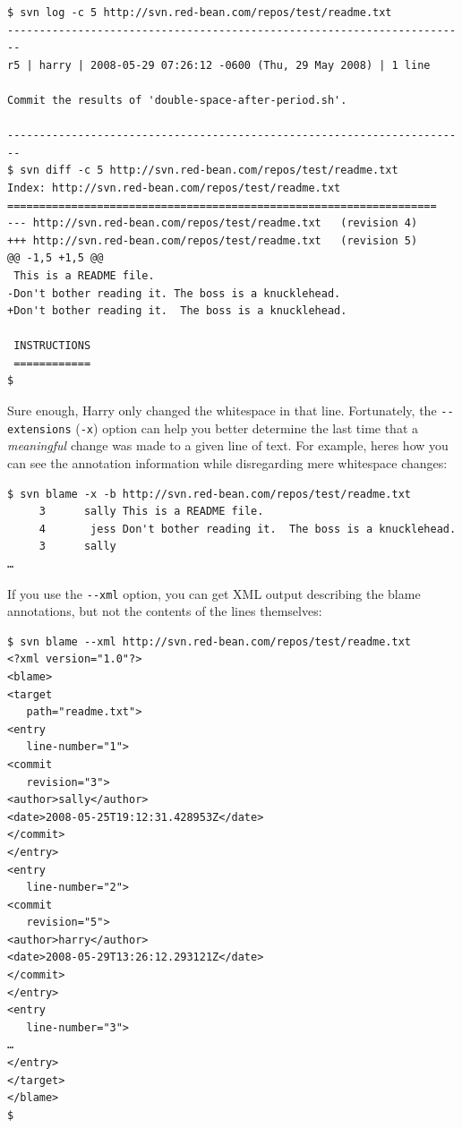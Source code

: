 \begin{verbatim}
$ svn log -c 5 http://svn.red-bean.com/repos/test/readme.txt
------------------------------------------------------------------------
r5 | harry | 2008-05-29 07:26:12 -0600 (Thu, 29 May 2008) | 1 line

Commit the results of 'double-space-after-period.sh'.

------------------------------------------------------------------------
$ svn diff -c 5 http://svn.red-bean.com/repos/test/readme.txt
Index: http://svn.red-bean.com/repos/test/readme.txt
===================================================================
--- http://svn.red-bean.com/repos/test/readme.txt   (revision 4)
+++ http://svn.red-bean.com/repos/test/readme.txt   (revision 5)
@@ -1,5 +1,5 @@
 This is a README file.
-Don't bother reading it. The boss is a knucklehead.
+Don't bother reading it.  The boss is a knucklehead.
  
 INSTRUCTIONS
 ============
$
\end{verbatim}

Sure enough, Harry only changed the whitespace in that line.
Fortunately, the \texttt{-\/-extensions} (\texttt{-x}) option can help
you better determine the last time that a \emph{meaningful} change was
made to a given line of text. For example, here\textquotesingle s how
you can see the annotation information while disregarding mere
whitespace changes:

\begin{verbatim}
$ svn blame -x -b http://svn.red-bean.com/repos/test/readme.txt
     3      sally This is a README file.
     4       jess Don't bother reading it.  The boss is a knucklehead.
     3      sally 
…
\end{verbatim}

If you use the \texttt{-\/-xml} option, you can get XML output
describing the blame annotations, but not the contents of the lines
themselves:

\begin{verbatim}
$ svn blame --xml http://svn.red-bean.com/repos/test/readme.txt
<?xml version="1.0"?>
<blame>
<target
   path="readme.txt">
<entry
   line-number="1">
<commit
   revision="3">
<author>sally</author>
<date>2008-05-25T19:12:31.428953Z</date>
</commit>
</entry>
<entry
   line-number="2">
<commit
   revision="5">
<author>harry</author>
<date>2008-05-29T13:26:12.293121Z</date>
</commit>
</entry>
<entry
   line-number="3">
…
</entry>
</target>
</blame>
$
\end{verbatim}

